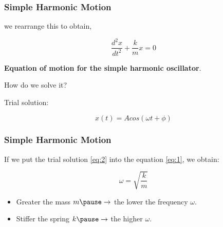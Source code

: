 \documentclass[]{beamer}
\begin{document}


\begin{frame}
\frametitle{Simple Harmonic Motion}



we rearrange this to obtain,


\pause
\begin{equation}
\boxed{\frac{d^2x}{dt^2}+\frac{k}{m} x=0}
\label{eq:1}
\end{equation} 

\pause
\vspace{3mm}

 \textbf{Equation of motion for the simple harmonic oscillator}. 
\vspace{3mm}
\pause

\textcolor{mypink1}{How do we solve it?}

\vspace{3mm}
\pause
Trial solution: 

\vspace{3mm}

\pause

\begin{equation}
x(t)=Acos(\omega t+\phi)
\label{eq:2}
\end{equation}


  \end{frame}



\begin{frame}
\frametitle{Simple Harmonic Motion}



If we put the trial solution \ref{eq:2} into the equation \ref{eq:1}, we obtain:

\pause
\begin{equation}
\boxed{\omega=\sqrt{\frac{k}{m}}}
\end{equation} 


\vspace{7mm}

\begin{itemize}
  \item Greater the mass $m\pause \rightarrow$ the lower the frequency $\omega$. \pause
  \item Stiffer the spring $k \pause\rightarrow$ the higher  $\omega$.
\end{itemize}






  \end{frame}
\end{document}
